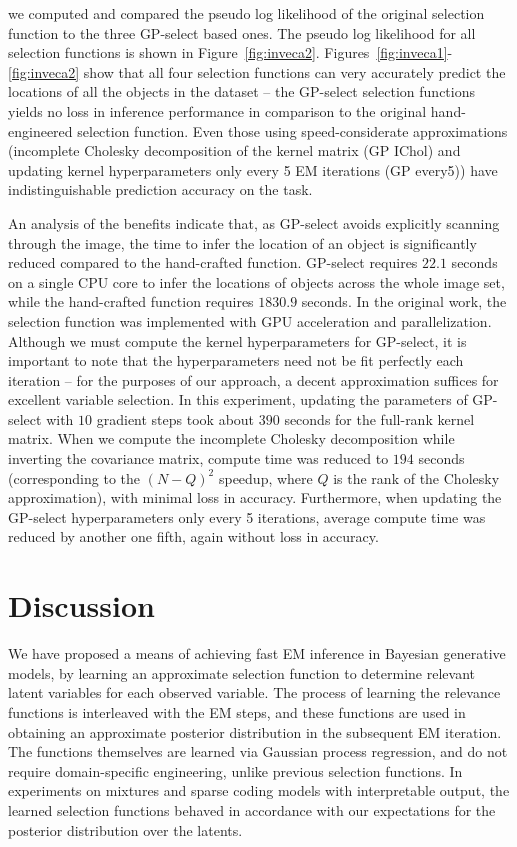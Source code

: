 \documentclass[12pt]{article}
\begin{document}
we computed and compared the pseudo log likelihood \citep{DaiEtAl2013} of the original selection function to the three GP-select based ones.
The pseudo log likelihood for all selection functions is shown in Figure~\ref{fig:inveca2}.
Figures~\ref{fig:inveca1}-\ref{fig:inveca2} show that all four selection functions can very accurately predict the locations of all the objects in the dataset -- 
the GP-select selection functions yields no loss in inference performance in comparison to the original hand-engineered selection function. 
Even those using speed-considerate approximations (incomplete Cholesky decomposition of the kernel matrix (GP IChol) and updating kernel hyperparameters only every 5 EM iterations (GP every5)) have indistinguishable prediction accuracy on the task.


An analysis of the benefits indicate that, as GP-select avoids explicitly scanning through the image, the time to infer the location of an object is significantly reduced compared to the hand-crafted function. GP-select requires $22.1$ seconds on a single CPU core to infer the locations of objects across the whole image set, while the hand-crafted function requires $1830.9$ seconds. In the original work, the selection function was implemented with GPU acceleration and parallelization. 
Although we must compute the kernel hyperparameters for GP-select, 
it is important to note that the hyperparameters need not be fit perfectly each iteration -- for the purposes of our approach, a decent approximation suffices for excellent variable selection. 
 In this experiment, updating the parameters of GP-select with $10$ gradient steps took about $390$ seconds for the full-rank kernel matrix. 
When we compute the incomplete Cholesky decomposition while inverting the covariance matrix, compute time was reduced to $194$ seconds (corresponding to the $(N-Q)^2$ speedup, where $Q$ is the rank of the Cholesky approximation), with minimal loss in accuracy.
Furthermore, when updating the GP-select hyperparameters only every 5 iterations, average compute time was reduced by another one fifth, again without loss in accuracy.

\section{Discussion}
\label{disc}
We have proposed a means of achieving fast EM inference in Bayesian generative models, by
learning an approximate selection function to determine relevant latent variables
for each observed variable. The process of learning the relevance functions
is interleaved with the EM steps, and these functions
are used in obtaining an approximate posterior distribution in the subsequent EM iteration.
The functions themselves are learned via Gaussian process regression,
and do not require domain-specific engineering, unlike previous selection functions.
In experiments on mixtures and sparse coding models with interpretable output,
the learned selection functions behaved in accordance with our expectations for the posterior
distribution over the latents.  
\end{document}
